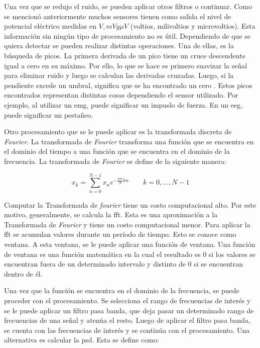 Una vez que se redujo el ruido, se pueden aplicar otros filtros o continuar. Como se mencionó anteriormente muchos sensores tienen como salida el nivel de potencial eléctrico medidas en $ V, mV y \mu V$ (voltios, milivoltios y microvoltios). Esta información sin ningún tipo de procesamiento no es útil. Dependiendo de que se quiera detectar se pueden realizar distintas operaciones. Una de ellas, es la búsqueda de picos. La primera derivada de un pico tiene un cruce descendente igual a cero en su máximo. Por ello, lo que se hace es primero suavizar la señal para eliminar ruido y luego se calculan las derivadas cruzadas. Luego, si la pendiente excede un umbral, significa que se ha encontrado un cero \cite{peak-finding}. Estos picos encontrados representan distintas cosas dependiendo el sensor utilizado. Por ejemplo, al utilizar un \acrshort{emg}, puede significar un impuslo de fuerza. En un \acrshort{eeg}, puede significar un pestañeo.

Otro procesamiento que se le puede aplicar es la transformada discreta de \emph{Fourier}. La transformada de \emph{Fourier} transforma una función que se encuentra en el dominio del tiempo a una función que se encuentra en el dominio de la frecuencia. La transformada de \emph{Fourier} se define de la siguiente manera:

$$ x_{k} = \sum_{n=0}^{N-1} x_{n}e^{-\frac{2 \pi i}{N}kn} \qquad k = 0,\hdots, N - 1 $$

Computar la Transformada de \emph{fourier} tiene un costo computacional alto. Por este motivo, generalmente, se calcula la \acrshort{fft}. Esta es una aproximación a la Transformada de \emph{Fourier} y tiene un costo computacional menor. Para aplicar la \acrshort{fft} se acumulan valores durante un período de tiempo. Esto se conoce como ventana. A esta ventana, se le puede aplicar una función de ventana. Una función de ventana es una función matemática en la cual el resultado es $0$ si los valores se encuentran fuera de un determinado intervalo y distinto de $0$ si se encuentran dentro de él. 

Una vez que la función se encuentra en el dominio de la frecuencia, se puede proceder con el procesamiento. Se selecciona el rango de frecuencias de interés y se le puede aplicar un filtro pasa banda, que deja pasar un determinado rango de frecuencias de una señal y atenúa el resto. Luego de aplicar el filtro pasa banda, se cuenta con las frecuencias de interés y se continúa con el procesamiento. Una alternativa es calcular la \acrshort{psd}. Esta se define como:

